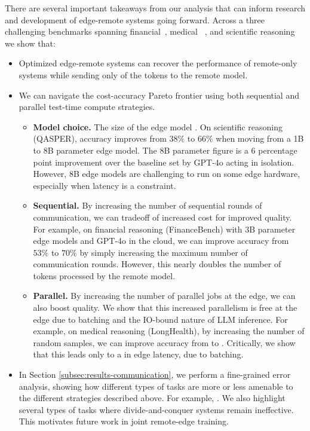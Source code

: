 There are several important takeaways from our analysis that can inform research and development of edge-remote systems going forward. Across a three challenging benchmarks spanning financial~\cite{islam2023financebench}, medical ~\cite{adams2024longhealth}, and scientific reasoning ~\cite{dasigi2021dataset} we show that:
\begin{itemize}
  \item Optimized edge-remote systems can recover the performance of remote-only systems while sending only  of the tokens to the remote model.
  \item We can navigate the cost-accuracy Pareto frontier using both sequential and parallel test-time compute strategies. 
    \begin{itemize}
        \item \textbf{Model choice.} The size of the edge model . On scientific reasoning (QASPER), accuracy improves from $38\%$ to $66\%$ when moving from a 1B to 8B parameter edge model. The 8B parameter figure is a 6 percentage point improvement over the baseline set by GPT-4o acting in isolation. However, 8B edge models are challenging to run on some edge hardware, especially when latency is a constraint.
        \item \textbf{Sequential.} By increasing the number of sequential rounds of communication, we can tradeoff of increased cost for improved quality. For example, on financial reasoning (FinanceBench) with 3B parameter edge models and GPT-4o in the cloud, we can improve accuracy from $53\%$ to $70\%$ by simply increasing the maximum number of communication rounds. However, this nearly doubles the number of tokens processed by the remote model.
        \item \textbf{Parallel.} By increasing the number of parallel jobs at the edge, we can also boost quality. We show that this increased parallelism is free at the edge due to batching and the IO-bound nature of LLM inference.  For example, on medical reasoning (LongHealth), by increasing the number of random samples, we can improve accuracy from  to . Critically, we show that this leads only to a  in edge latency, due to batching.
    \end{itemize}
  \item In Section \ref{subsec:results-communication}, we perform a fine-grained error analysis, showing how different types of tasks are more or less amenable to the different strategies described above. For example, . We also highlight several types of tasks where divide-and-conquer systems remain ineffective. This motivates future work in joint remote-edge training. 
\end{itemize}
